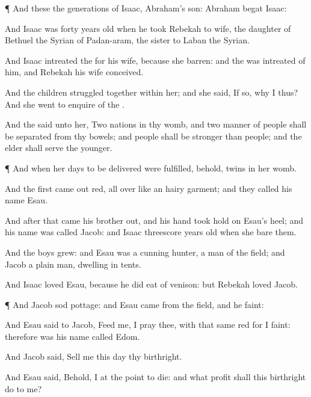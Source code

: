 {\par }{\PP {}¶ And these
{} the
generations of
Isaac,
Abraham’s
son:
Abraham
begat
Isaac:

And
Isaac was
forty
years
old when he
took
Rebekah to
wife, the
daughter of
Bethuel the
Syrian of
Padan-aram, the
sister to
Laban the
Syrian.

And
Isaac
intreated the
{}
for his
wife, because she
{}
barren: and the
{} was
intreated of him, and
Rebekah his
wife
conceived.

And the
children struggled
together within
her; and she
said, If
{} so, why
{} I
thus? And she
went to
enquire of the
{}.

And the
{}
said unto her,
Two
nations
{} in thy
womb, and two
manner of
people shall be
separated from thy
bowels; and
{}
people shall be
stronger than
{}
people; and the
elder shall
serve the
younger.


\par }{\PP {}¶ And when her
days to be
delivered were
fulfilled, behold,
{}
twins in her
womb.

And the
first came
out
red, all over like an
hairy
garment; and they
called his
name
Esau.

And
after that
came his
brother
out, and his
hand took
hold on
Esau’s
heel; and his
name was
called
Jacob: and
Isaac
{}
threescore
years
old when she
bare them.

And the
boys
grew: and
Esau was a
cunning
hunter, a
man of the
field; and
Jacob
{} a
plain
man,
dwelling in
tents.

And
Isaac
loved
Esau, because he did
eat of
{}
venison: but
Rebekah
loved
Jacob.


\par }{\PP {}¶ And
Jacob
sod
pottage: and
Esau
came from the
field, and he
{}
faint:

And
Esau
said to
Jacob,
Feed me, I pray thee,
with that
same
red
{} for I
{}
faint: therefore was his
name
called
Edom.

And
Jacob
said,
Sell me this
day thy
birthright.

And
Esau
said, Behold, I
{} at the
point to
die: and what profit shall this
birthright do to me?

}
